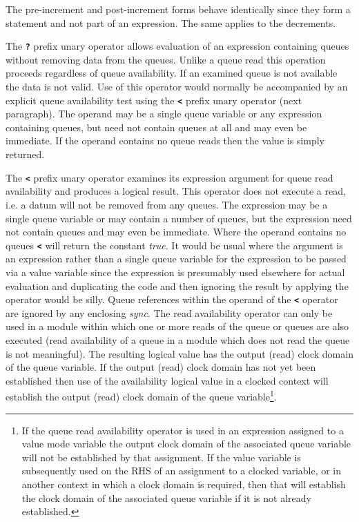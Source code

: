         The pre-increment and post-increment forms behave identically since they
        form a statement and not part of an expression. The same applies to the
        decrements.

        The {\bf \verb'?'} prefix unary operator allows evaluation of an
        expression containing queues without removing data from the queues.
        Unlike a queue read this operation proceeds regardless of queue
        availability. If an examined queue is not available the data is not
        valid. Use of this operator would normally be accompanied by an
        explicit queue availability test using the {\bf \verb'<'} prefix unary
        operator (next paragraph). The operand may be a single queue variable
        or any expression containing queues, but need not contain queues at all
        and may even be immediate. If the operand contains no queue reads then
        the value is simply returned.

        The {\bf \verb'<'} prefix unary operator examines its expression argument
        for queue read availability and produces a logical result. This operator does
        not execute a read, i.e. a datum will not be removed from any queues. The
        expression may be a single queue variable or may contain a number of queues,
        but the expression need not contain queues and may even be immediate.
        Where the operand contains no queues {\bf \verb'<'} will return the constant
        {\em true}. It would be usual where the argument is an expression rather
        than a single queue variable for the expression to be passed via a value
        variable since the expression is presumably used elsewhere for actual
        evaluation and duplicating the code and then ignoring the result by applying
        the operator would be silly. Queue references within the operand of the {\bf
        \verb'<'} operator are ignored by any enclosing {\em sync}. The read
        availability operator can only be used in a module within which one or more
        reads of the queue or queues are also executed (read availability of a queue in
        a module which does not read the queue is not meaningful). The resulting
        logical value has the output (read) clock domain of the queue variable. If
        the output (read) clock domain has not yet been established then use of the
        availability logical value in a clocked context will establish the output
        (read) clock domain of the queue variable\footnote{If the queue read
        availability operator is used in an expression assigned to a value mode
        variable the output clock domain of the associated queue variable will not be
        established by that assignment. If the value variable is subsequently used
        on the RHS of an assignment to a clocked variable, or in another context in
        which a clock domain is required, then that will establish the clock domain
        of the associated queue variable if it is not already established.}.

